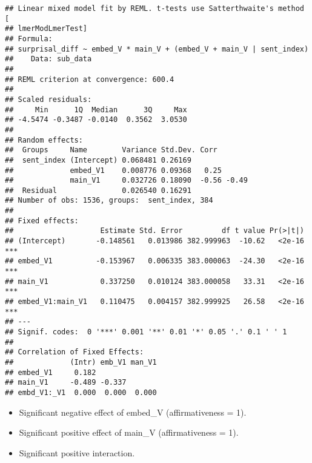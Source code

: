 \documentclass[]{ltjsarticle}
\providecommand{\tightlist}{%
  \setlength{\itemsep}{0pt}\setlength{\parskip}{0pt}}
\begin{document}
\begin{verbatim}
## Linear mixed model fit by REML. t-tests use Satterthwaite's method [
## lmerModLmerTest]
## Formula: 
## surprisal_diff ~ embed_V * main_V + (embed_V + main_V | sent_index)
##    Data: sub_data
## 
## REML criterion at convergence: 600.4
## 
## Scaled residuals: 
##     Min      1Q  Median      3Q     Max 
## -4.5474 -0.3487 -0.0140  0.3562  3.0530 
## 
## Random effects:
##  Groups     Name        Variance Std.Dev. Corr       
##  sent_index (Intercept) 0.068481 0.26169             
##             embed_V1    0.008776 0.09368   0.25      
##             main_V1     0.032726 0.18090  -0.56 -0.49
##  Residual               0.026540 0.16291             
## Number of obs: 1536, groups:  sent_index, 384
## 
## Fixed effects:
##                    Estimate Std. Error         df t value Pr(>|t|)    
## (Intercept)       -0.148561   0.013986 382.999963  -10.62   <2e-16 ***
## embed_V1          -0.153967   0.006335 383.000063  -24.30   <2e-16 ***
## main_V1            0.337250   0.010124 383.000058   33.31   <2e-16 ***
## embed_V1:main_V1   0.110475   0.004157 382.999925   26.58   <2e-16 ***
## ---
## Signif. codes:  0 '***' 0.001 '**' 0.01 '*' 0.05 '.' 0.1 ' ' 1
## 
## Correlation of Fixed Effects:
##             (Intr) emb_V1 man_V1
## embed_V1     0.182              
## main_V1     -0.489 -0.337       
## embd_V1:_V1  0.000  0.000  0.000
\end{verbatim}

\begin{itemize}
\tightlist
\item
  Significant negative effect of embed\_V (affirmativeness = 1).
\item
  Significant positive effect of main\_V (affirmativeness = 1).
\item
  Significant positive interaction.
\end{itemize}
\end{document}
